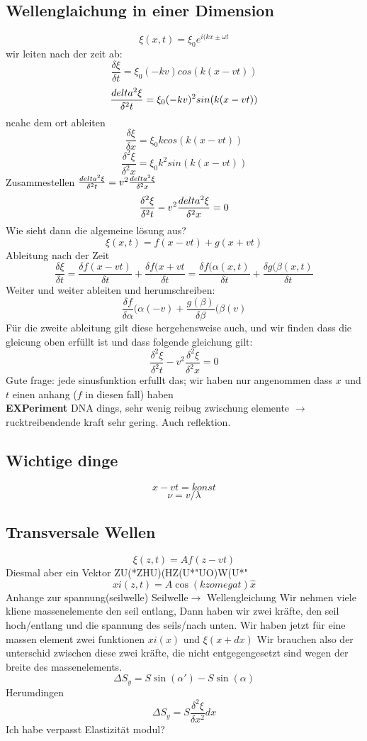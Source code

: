 \documentclass{article}
\begin{document}
\subsection{Wellenglaichung in einer Dimension}
\[\xi(x,t)=\xi_0e^{i(kx\pm \omega t}\]
wir leiten nach der zeit ab:
\[\frac{\delta\xi}{\delta t}=\xi_0(-kv)cos(k(x-vt))\]
\[\frac{\\delta^2\xi}{\delta^2t}=\xi_0(-kv)^2sin(k(x-vt))\]
ncahc dem ort ableiten
\[\frac{\delta\xi}{\delta x}=\xi_0kcos(k(x-vt))\]
\[\frac{\delta^2\xi}{\delta^2x}=\xi_0k^2sin(k(x-vt))\]
Zusammestellen $\frac{\\delta^2\xi}{\delta^2t}=v^2\frac{\\delta^2\xi}{\delta^2x}$
\[\frac{\delta^2\xi}{\delta^2t}-v^2\frac{\\delta^2\xi}{\delta^2x}=0\]
Wie sieht dann die algemeine lösung aus?
\[\xi(x,t)=f(x-vt)+g(x+vt)\]
Ableitung nach der Zeit
\[\frac{\delta\xi}{\delta t}=\frac{\delta f(x-vt)}{\delta t}+\frac{\delta f(x+vt}{\delta t}=\frac{\delta f(\alpha(x,t)}{\delta t}+\frac{\delta g(\beta(x,t)}{\delta t}\]
Weiter und weiter ableiten und herumschreiben:
\[\frac{\delta f}{\delta \alpha}(\alpha(-v)+\frac{g(\beta)}{\delta \beta}(\beta(v)\]
Für die zweite ableitung gilt diese hergehensweise auch, und wir finden dass die gleicung oben erfüllt ist und dass folgende gleichung gilt:
\[\frac{\delta^2\xi}{\delta^2t}-v^2\frac{\delta^2\xi}{\delta^2x}=0\]
Gute frage: jede sinusfunktion erfullt das; wir haben nur angenommen dass $x$ und $t$ einen anhang ($f$ in diesen fall) haben\\
\textbf{EXPeriment} DNA dings, sehr wenig reibug zwischung elemente $\rightarrow$ rucktreibendende kraft sehr gering. Auch reflektion. \\
\subsection{Wichtige dinge}
\[x-vt=konst\]
\[\nu=v/\lambda\]
\subsection{Transversale Wellen}
\[\xi(z,t)=Af(z-vt)\]
Diesmal aber ein Vektor ZU(*ZHU)(HZ(U*"UO)W(U*"\\
\[xi(z,t)=A\cos(kz                omega t)\hat{x}\]
Anhange zur spannung(seilwelle) Seilwelle$\rightarrow$ Wellengleichung
Wir nehmen viele kliene massenelemente den seil entlang, Dann haben wir zwei kräfte, den seil hoch/entlang und die spannung des seils/nach unten. Wir haben jetzt für eine massen element zwei funktionen $xi(x)$ und $\xi(x+dx)$ Wir brauchen also der unterschid zwischen diese zwei kräfte, die nicht entgegengesetzt sind wegen der breite des massenelements.
\[\Delta S_y=S\sin(\alpha')-S\sin(\alpha)\]
Herumdingen
\[\Delta S_y=S\frac{\delta^2\xi}{\delta x^2} dx\]
Ich habe verpasst Elastizität modul?
\end{document}
